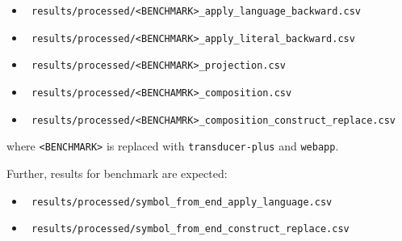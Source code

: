 \begin{itemize}
\begin{itemize}
    \item \texttt{
    results/processed/<BENCHMARK>\_apply\_language_backward.csv
    }
    \item \texttt{
      results/processed/<BENCHMARK>\_apply\_literal_backward.csv
    }

    \item \texttt{
results/processed/<BENCHMARK>\_projection.csv
    }

    \item \texttt{
results/processed/<BENCHAMRK>\_composition.csv
    }
    \item \texttt{
results/processed/<BENCHAMRK>\_composition_construct_replace.csv
    }

  \end{itemize}
  where \texttt{<BENCHMARK>} is replaced with \texttt{transducer-plus} and \texttt{webapp}.

  Further, results for benchmark \symbolFromEnd are expected:
  \begin{itemize}
    \item \texttt{
      results/processed/symbol_from_end\_apply_language.csv
    }
    \item \texttt{
      results/processed/symbol_from_end\_construct_replace.csv
    }
  \end{itemize}

\end{itemize}








%

